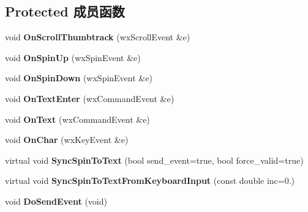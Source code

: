 \subsection*{Protected 成员函数}
\begin{DoxyCompactItemize}
\item 
\hypertarget{classwx_spin_ctrl_dbl_a2b1b68c6a48afcfc3a260152a88adc40}{void {\bfseries On\+Scroll\+Thumbtrack} (wx\+Scroll\+Event \&e)}\label{classwx_spin_ctrl_dbl_a2b1b68c6a48afcfc3a260152a88adc40}

\item 
\hypertarget{classwx_spin_ctrl_dbl_a481ead93194012a9c320b7845a2fc340}{void {\bfseries On\+Spin\+Up} (wx\+Spin\+Event \&e)}\label{classwx_spin_ctrl_dbl_a481ead93194012a9c320b7845a2fc340}

\item 
\hypertarget{classwx_spin_ctrl_dbl_a9de999eceb793f5213ec8a12e5eec5dc}{void {\bfseries On\+Spin\+Down} (wx\+Spin\+Event \&e)}\label{classwx_spin_ctrl_dbl_a9de999eceb793f5213ec8a12e5eec5dc}

\item 
\hypertarget{classwx_spin_ctrl_dbl_a56ce7683b4a642a425d242cc1b40994c}{void {\bfseries On\+Text\+Enter} (wx\+Command\+Event \&e)}\label{classwx_spin_ctrl_dbl_a56ce7683b4a642a425d242cc1b40994c}

\item 
\hypertarget{classwx_spin_ctrl_dbl_a0488ce007e9c57da6973654bb8ae986f}{void {\bfseries On\+Text} (wx\+Command\+Event \&e)}\label{classwx_spin_ctrl_dbl_a0488ce007e9c57da6973654bb8ae986f}

\item 
\hypertarget{classwx_spin_ctrl_dbl_add02146ddbba2fc1d98dfd2182d6db19}{void {\bfseries On\+Char} (wx\+Key\+Event \&e)}\label{classwx_spin_ctrl_dbl_add02146ddbba2fc1d98dfd2182d6db19}

\item 
\hypertarget{classwx_spin_ctrl_dbl_ac51960bf005043dc52712aaf7bfb102d}{virtual void {\bfseries Sync\+Spin\+To\+Text} (bool send\+\_\+event=true, bool force\+\_\+valid=true)}\label{classwx_spin_ctrl_dbl_ac51960bf005043dc52712aaf7bfb102d}

\item 
\hypertarget{classwx_spin_ctrl_dbl_a3a0b1dbc73718bc7f4ec9b85a743cb07}{virtual void {\bfseries Sync\+Spin\+To\+Text\+From\+Keyboard\+Input} (const double inc=0.)}\label{classwx_spin_ctrl_dbl_a3a0b1dbc73718bc7f4ec9b85a743cb07}

\item 
\hypertarget{classwx_spin_ctrl_dbl_a2f293f55aa922b701a97d66c1b56b005}{void {\bfseries Do\+Send\+Event} (void)}\label{classwx_spin_ctrl_dbl_a2f293f55aa922b701a97d66c1b56b005}


\end{DoxyCompactItemize}
